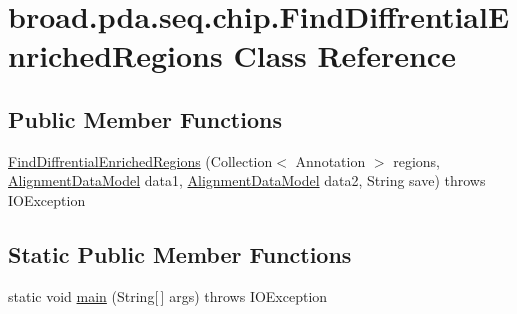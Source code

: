 \hypertarget{classbroad_1_1pda_1_1seq_1_1chip_1_1_find_diffrential_enriched_regions}{\section{broad.\+pda.\+seq.\+chip.\+Find\+Diffrential\+Enriched\+Regions Class Reference}
\label{classbroad_1_1pda_1_1seq_1_1chip_1_1_find_diffrential_enriched_regions}
}
\subsection*{Public Member Functions}
\begin{DoxyCompactItemize}
\item 
\hyperlink{classbroad_1_1pda_1_1seq_1_1chip_1_1_find_diffrential_enriched_regions_a7954cc89a53ebefabb09d3fba8878d96}{Find\+Diffrential\+Enriched\+Regions} (Collection$<$ Annotation $>$ regions, \hyperlink{interfacebroad_1_1pda_1_1seq_1_1segmentation_1_1_alignment_data_model}{Alignment\+Data\+Model} data1, \hyperlink{interfacebroad_1_1pda_1_1seq_1_1segmentation_1_1_alignment_data_model}{Alignment\+Data\+Model} data2, String save)  throws I\+O\+Exception
\end{DoxyCompactItemize}
\subsection*{Static Public Member Functions}
\begin{DoxyCompactItemize}
\item 
static void \hyperlink{classbroad_1_1pda_1_1seq_1_1chip_1_1_find_diffrential_enriched_regions_a858019a15b343539847303fda46c7ce9}{main} (String\mbox{[}$\,$\mbox{]} args)  throws I\+O\+Exception 
\end{DoxyCompactItemize}


